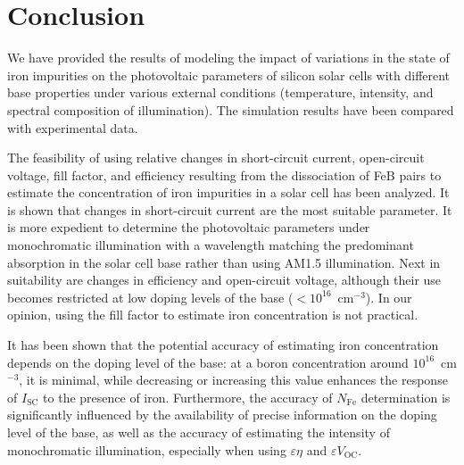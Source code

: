 \documentclass[a4paper,fleqn]{cas-sc}
\begin{document}
\section{Conclusion}

We have provided the results of modeling the impact of variations in the
state of iron impurities on the photovoltaic parameters of silicon solar cells
with different base properties under various external conditions
(temperature, intensity, and spectral composition of illumination).
The simulation results have been compared with experimental data.

The feasibility of using relative changes in short-circuit current, open-circuit voltage, 
fill factor, and efficiency resulting from the dissociation of FeB pairs 
to estimate the concentration of iron impurities in a solar cell has been analyzed.
It is shown that changes in short-circuit current are the most suitable parameter.
It is more expedient to determine the photovoltaic parameters under monochromatic illumination 
with a wavelength matching the predominant absorption in the solar cell base rather than using AM1.5 illumination.
Next in suitability are changes in efficiency and open-circuit voltage, 
although their use becomes restricted at low doping levels of the base ($<10^{16}$~cm$^{-3}$).
In our opinion, using the fill factor to estimate iron concentration is not practical.

It has been shown that the potential accuracy of estimating iron concentration depends 
on the doping level of the base: 
at a boron concentration around $10^{16}$~cm$^{-3}$, it is minimal, 
while decreasing or increasing this value enhances the response of $I_\mathrm{SC}$ to the presence of iron.
Furthermore, the accuracy of $N_\mathrm{Fe}$ determination is significantly influenced by the availability 
of precise information on the doping level of the base, 
as well as the accuracy of estimating the intensity of monochromatic illumination, 
especially when using $\varepsilon \eta$ and $\varepsilon V_\mathrm{OC}$.

\end{document}
